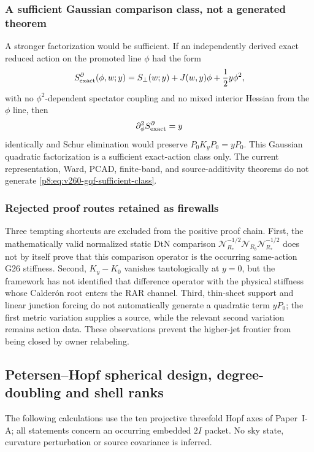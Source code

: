 \documentclass[12pt,a4paper]{article}
\begin{document}
\subsubsection{A sufficient Gaussian comparison class, not a generated theorem}
A stronger factorization would be sufficient.  If an independently derived
exact reduced action on the promoted line \(\phi\) had the form
\begin{equation}
 \label{p8:eq:v260-gqf-sufficient-class}
 S^\partial_{\rm exact}(\phi,w;y)
 =S_\perp(w;y)+J(w,y)\phi+\frac12y\phi^2,
\end{equation}
with no \(\phi^2\)-dependent spectator coupling and no mixed interior Hessian
from the \(\phi\) line, then
\[
 \partial_\phi^2S^\partial_{\rm exact}=y
\]
identically and Schur elimination would preserve
\(P_0K_yP_0=yP_0\).  This Gaussian quadratic factorization is a sufficient
exact-action class only.  The current representation, Ward, PCAD, finite-band,
and source-additivity theorems do not generate
\eqref{p8:eq:v260-gqf-sufficient-class}.

\subsubsection{Rejected proof routes retained as firewalls}
Three tempting shortcuts are excluded from the positive proof chain.
First, the mathematically valid normalized static DtN comparison
\(
\mathcal N_{R_*}^{-1/2}\mathcal N_{R_b}\mathcal N_{R_*}^{-1/2}
\)
does not by itself prove that this comparison operator is the occurring
same-action G26 stiffness.  Second,
\(K_y-K_0\) vanishes tautologically at \(y=0\), but the framework has not
identified that difference operator with the physical stiffness whose
Calder\'on root enters the RAR channel.  Third, thin-sheet support and linear
junction forcing do not automatically generate a quadratic term
\(yP_0\); the first metric variation supplies a source, while the relevant
second variation remains action data.  These observations prevent the
higher-jet frontier from being closed by owner relabeling.



\subsection{Petersen--Hopf spherical design, degree-doubling and shell ranks}
\label{p6c:sec:v322-petersen-harmonic-certificate}
The following calculations use the ten projective threefold Hopf axes of
Paper~I-A; all statements concern an occurring embedded $2I$ packet.
No sky state, curvature perturbation or source covariance is inferred.
\end{document}
